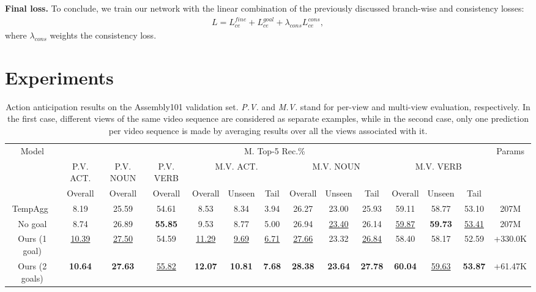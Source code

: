 \documentclass{article}
\begin{document}
\textbf{Final loss.} To conclude, we train our network with the linear combination of the previously discussed branch-wise and consistency losses:
\begin{align}
L = L_{ce}^{fine} + L_{ce}^{goal} + \lambda_{cons}L_{ce}^{cons},
\end{align}
where $\lambda_{cons}$ weights the consistency loss. 

\vspace{-0.25cm}
\section{Experiments}
\label{sec:experiments}

\begin{table*}[t!]
\centering
\scriptsize
\begin{tabular}{|c|c|c|c||c|c|c|c|c|c|c|c|c|c|}
    \hline
    \multirow{3}{*}{Model}& \multicolumn{12}{c|}{M. Top-5 Rec.\%} & \multirow{3}{*}{Params} \\
    \cline{2-13}
    & P.V. ACT. & P.V. NOUN & P.V. VERB & \multicolumn{3}{c|}{M.V. ACT.} & \multicolumn{3}{c|}{M.V. NOUN} & \multicolumn{3}{c|}{M.V. VERB} & \\
    \cline{2-13}
    & Overall & Overall & Overall & Overall & Unseen & Tail & Overall & Unseen & Tail & Overall & Unseen & Tail &  \\
    \hline
    \hline
    TempAgg~\cite{sener2022assembly101} & 8.19 & 25.59 & 54.61 & 8.53 & 8.34 & 3.94 & 26.27 & 23.00 & 25.93 & 59.11 & 58.77 & 53.10 & 207M \\
    \hline
    \hline
    No goal & 8.74 & 26.89 & \textbf{55.85} & 9.53 & 8.77 & 5.00 & 26.94 & \underline{23.40} & 26.14 & \underline{59.87} & \textbf{59.73} & \underline{53.41} & 207M \\
    \hline
    Ours (1 goal) & \underline{10.39} & \underline{27.50} & 54.59 & \underline{11.29} & \underline{9.69} & \underline{6.71} & \underline{27.66} & 23.32 & \underline{26.84} & 58.40 & 58.17 & 52.59 & +330.0K \\ 
    \hline
    Ours (2 goals) & \textbf{10.64} & \textbf{27.63} & \underline{55.82} & \textbf{12.07} & \textbf{10.81} & \textbf{7.68} & \textbf{28.38 }& \textbf{23.64} & \textbf{27.78} & \textbf{60.04} & \underline{59.63} & \textbf{53.87} & +61.47K \\
    \hline
\end{tabular}
\caption{\small Action anticipation results on the Assembly101 validation set. \textit{P.V.} and \textit{M.V.} stand for per-view and multi-view evaluation, respectively. In the first case, different views of the same video sequence are considered as separate examples, while in the second case, only one prediction per video sequence is made by averaging results over all the views associated with it.}
\label{tab:res_assembly}
\end{table*}
\end{document}
